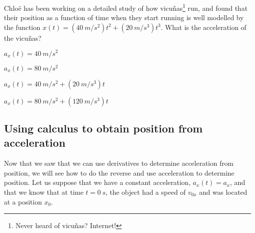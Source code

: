 \begin{checkpointMC}{Chlo\"e has been working on a detailed study of how vicu\~nas\footnote{Never heard of vicu\~nas? Internet!} run, and found that their position as a function of time when they start running is well modelled by the function $x(t)=(\SI{40}{m/s^2})t^2+(\SI{20}{m/s^3})t^3$. What is the acceleration of the vicu\~nas?}
\item $a_x(t)=\SI{40}{m/s^2}$
\item $a_x(t)=\SI{80}{m/s^2}$
\item $a_x(t)=\SI{40}{m/s^2}+(\SI{20}{m/s^3})t$
\item $a_x(t)=\SI{80}{m/s^2}+(\SI{120}{m/s^3})t$ %
\end{checkpointMC}

\subsection{Using calculus to obtain position from acceleration}
Now that we saw that we can use derivatives to determine acceleration from position, we will see how to do the reverse and use acceleration to determine position. Let us suppose that we have a constant acceleration, $a_x(t)=a_x$, and that we know that at time $t=\SI{0}{s}$, the object had a speed of $v_{0x}$ and was located at a position $x_0$. 

